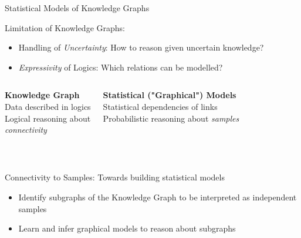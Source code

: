 \documentclass{beamer}
\begin{document}
\begin{frame}{Statistical Models of Knowledge Graphs}
	
	Limitation of Knowledge Graphs:
	\begin{itemize}
		\item Handling of \emph{Uncertainty}: How to reason given uncertain knowledge?
		\item \emph{Expressivity} of Logics: Which relations can be modelled?
	\end{itemize}
	
	\begin{columns}
		\begin{center}
			\textbf{Knowledge Graph} \\
			{Data described in logics} \\
			Logical reasoning about \\ 
			\emph{connectivity}
		\end{center}
			\centering

		\begin{center}
		\textbf{Statistical ("Graphical") Models} \\
			{Statistical dependencies of links} \\
			Probabilistic reasoning about \emph{samples}
		\end{center}
		
	\end{columns}

	\ \\ 
	
	\begin{block}{Connectivity to Samples: Towards building statistical models}
		\begin{itemize}
			\item Identify subgraphs of the Knowledge Graph to be interpreted as independent samples
			\item Learn and infer graphical models to reason about subgraphs
		\end{itemize}
	\end{block}

\end{frame}
\end{document}
